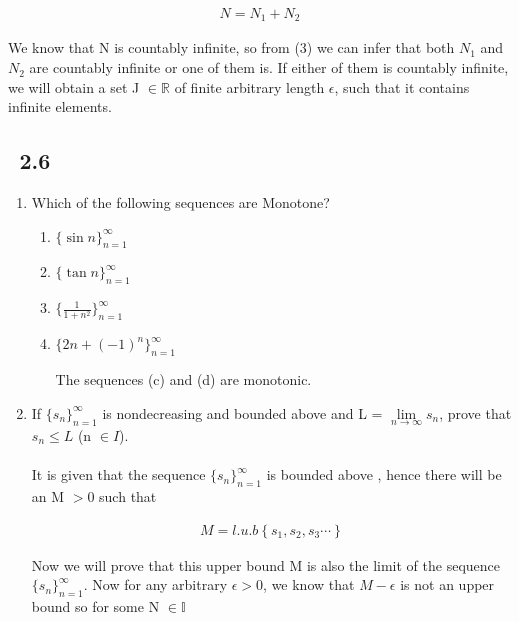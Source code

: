 \documentclass[11pt, letterpaper]{article}
\begin{document}
\begin{enumerate}
{	\begin{eqnarray}
		N = N_1 + N_2
	\end{eqnarray}
	
	We know that N is countably infinite, so from (3) we can infer that both $N_1$ and $N_2$ are countably infinite or one of them is. If either of them is countably infinite, we will obtain a set J $\in \mathbb{R}$ of finite arbitrary length $\epsilon$, such that it contains infinite elements.
}

\end{enumerate}
\clearpage

\subsection{\exr \, 2.6}
\begin{enumerate}
\item{Which of the following sequences are Monotone?
	\begin{enumerate}
		\item{$ \lbrace \sin{n} \rbrace_{n=1}^\infty $}
		\item{$ \lbrace \tan{n} \rbrace_{n=1}^\infty $}
		\item{$ \lbrace \frac{1}{1+n^2} \rbrace_{n=1}^\infty $}
		\item{$ \lbrace 2n + (-1)^n \rbrace_{n=1}^\infty $}
		
		The sequences (c) and (d) are monotonic.
	\end{enumerate}
}

\item{If $ \lbrace s_n \rbrace_{n=1}^\infty $ is nondecreasing and bounded above and L = $\lim \limits_{n \to \infty} s_n$, prove that $s_n \leq L$ (n $\in I$).\\\\
	It is given that the sequence $ \lbrace s_n \rbrace_{n=1}^\infty $ is bounded above , hence there will be an M $>0$ such that
	
	\setcounter{equation}{0}
	
	\begin{eqnarray}
		M = l.u.b \left\lbrace s_1, s_2, s_3 \cdots \right\rbrace
	\end{eqnarray}
	
	Now we will prove that this upper bound M is also the limit of the sequence $ \lbrace s_n \rbrace_{n=1}^\infty $. Now for any arbitrary $\epsilon > 0$, we know that $M - \epsilon$ is not an upper bound so for some N $\in \mathbb{I}$
	
}
\end{enumerate}
\end{document}
